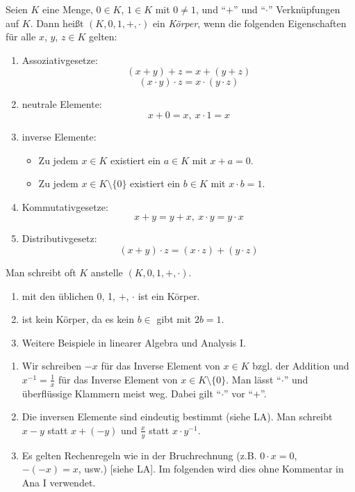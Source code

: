\documentclass[12pt]{scrreprt}
\begin{document}
\begin{dfn}
\label{dfn:zahlen.koerper}
Seien $K$ eine Menge, $0 \in K$, $1 \in K$ mit $0 \ne 1$, und "`$+$"' und "`$\cdot$"' Verknüpfungen auf 
$K$. Dann heißt $(K, 0, 1, +, \cdot)$ ein \emph{Körper}, wenn die folgenden Eigenschaften für alle 
$x$, $y$, $z \in K$ gelten:

\begin{enumerate}
\item Assoziativgesetze:
\[(x + y) + z = x + (y + z)\]
\[(x \cdot y) \cdot z = x \cdot (y \cdot z)\]

\item neutrale Elemente:
\[x + 0 = x,\ x \cdot 1 = x\]

\item inverse Elemente:
\begin{itemize}
  \item Zu jedem $x \in K$ existiert ein $a \in K$ mit $x + a = 0$.
  \item Zu jedem $x \in K \setminus \{0\}$ existiert ein $b \in K$ mit $x \cdot b = 1$.
\end{itemize}

\item Kommutativgesetze:
\[x + y = y + x,\ x \cdot y = y \cdot x\]

\item Distributivgesetz:
\[(x + y) \cdot z = (x \cdot z) + (y \cdot z)\]
\end{enumerate}

Man schreibt oft $K$ anstelle $(K, 0, 1, +, \cdot)$.
\end{dfn}

\begin{bsp*}
\begin{enumerate}
\item {} mit den üblichen 0, 1, $+$, $\cdot$ ist ein Körper.
\item {} ist kein Körper, da es kein $b \in$  gibt mit $2b = 1$.
\item Weitere Beispiele in linearer Algebra und Analysis I.
\end{enumerate}
\end{bsp*}

\begin{bem*}
\begin{enumerate} %
\item Wir schreiben $-x$ für das Inverse Element von $x \in K$ bzgl. der Addition und $\displaystyle x^{-1} = \frac{1}{x}$ für das Inverse Element von $x \in K \setminus \{0\}$. Man lässt "`$\cdot$"' und überflüssige Klammern meist weg. Dabei gilt "`$\cdot$"' vor "`$+$"'.

\item Die inversen Elemente sind eindeutig bestimmt (siehe LA). Man schreibt $x - y$ statt $x + (-y)$ und $\displaystyle\frac{x}{y}$ statt $x \cdot y^{-1}$.

\item Es gelten Rechenregeln wie in der Bruchrechnung (z.B. $0 \cdot x = 0$, $-(-x) = x$, usw.) [siehe LA]. Im folgenden wird dies ohne Kommentar in Ana I verwendet.
\end{enumerate}
\end{bem*}
\end{document}
